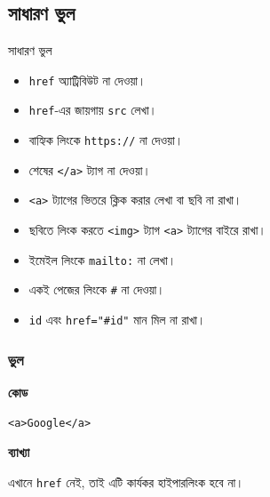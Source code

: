 \subsection{সাধারণ ভুল}

\begin{mistakebox}{সাধারণ ভুল}
\par\noindent
\begin{minipage}[t]{.48\linewidth}\vspace{0pt}
\begin{itemize}
\item \texttt{href} অ্যাট্রিবিউট না দেওয়া।
\item \texttt{href}-এর জায়গায় \texttt{src} লেখা।
\item বাহ্যিক লিংকে \texttt{https://} না দেওয়া।
\item শেষের \texttt{</a>} ট্যাগ না দেওয়া।
\item \texttt{<a>} ট্যাগের ভিতরে ক্লিক করার লেখা বা ছবি না রাখা।
\end{itemize}
\end{minipage}\hfill
\begin{minipage}[t]{.48\linewidth}\vspace{0pt}
\begin{itemize}
\item ছবিতে লিংক করতে \texttt{<img>} ট্যাগ \texttt{<a>} ট্যাগের বাইরে রাখা।
\item ইমেইল লিংকে \texttt{mailto:} না লেখা।
\item একই পেজের লিংকে \texttt{\#} না দেওয়া।
\item \texttt{id} এবং \texttt{href="\#id"} মান মিল না রাখা।
\end{itemize}
\end{minipage}\par

\end{mistakebox}

\subsubsection{ভুল}

\par\noindent
\begin{minipage}[t]{.50\linewidth}\vspace{0pt}\small
\textbf{\color{chFourTeal}কোড}\par
\begin{verbatim}
<a>Google</a>
\end{verbatim}

\par\smallskip
\end{minipage}\hfill
\begin{minipage}[t]{.46\linewidth}\vspace{0pt}\small
\textbf{\color{chFourTeal}ব্যাখ্যা}\par
এখানে \texttt{href} নেই, তাই এটি কার্যকর হাইপারলিংক হবে না।
\end{minipage}\par
